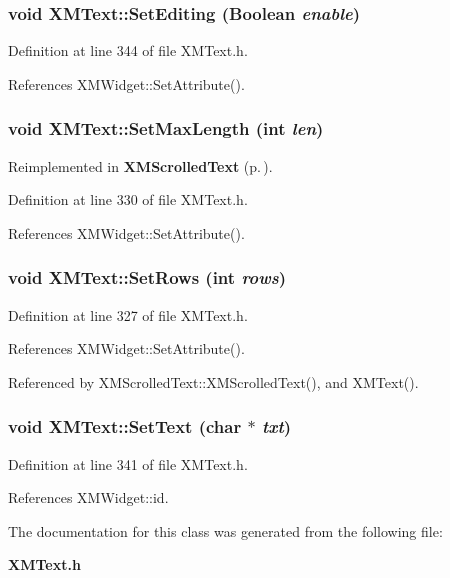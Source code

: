 \subsubsection{\setlength{\rightskip}{0pt plus 5cm}void XMText::Set\-Editing (Boolean {\em enable})\hspace{0.3cm}{\tt  [inline]}}\label{classXMText_a11}




Definition at line 344 of file XMText.h.

References XMWidget::Set\-Attribute().
\subsubsection{\setlength{\rightskip}{0pt plus 5cm}void XMText::Set\-Max\-Length (int {\em len})\hspace{0.3cm}{\tt  [inline]}}\label{classXMText_a6}




Reimplemented in {\bf XMScrolled\-Text} {\rm (p.\,\pageref{classXMScrolledText_a2})}.

Definition at line 330 of file XMText.h.

References XMWidget::Set\-Attribute().
\subsubsection{\setlength{\rightskip}{0pt plus 5cm}void XMText::Set\-Rows (int {\em rows})\hspace{0.3cm}{\tt  [inline]}}\label{classXMText_a5}




Definition at line 327 of file XMText.h.

References XMWidget::Set\-Attribute().

Referenced by XMScrolled\-Text::XMScrolled\-Text(), and XMText().
\subsubsection{\setlength{\rightskip}{0pt plus 5cm}void XMText::Set\-Text (char $\ast$ {\em txt})\hspace{0.3cm}{\tt  [inline]}}\label{classXMText_a10}




Definition at line 341 of file XMText.h.

References XMWidget::id.

The documentation for this class was generated from the following file:\begin{CompactItemize}
\item 
{\bf XMText.h}\end{CompactItemize}
